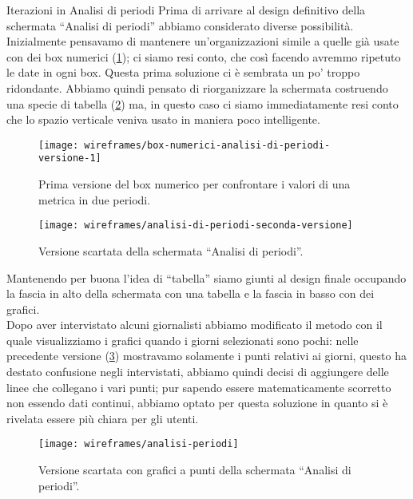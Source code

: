\documentclass[../../../main.tex]{subfiles}
\begin{document}
\begin{bclogo}{Iterazioni in Analisi di periodi}
Prima di arrivare al design definitivo della schermata ``Analisi di periodi'' abbiamo considerato diverse possibilità.\\
Inizialmente pensavamo di mantenere un'organizzazioni simile a quelle già usate con dei box numerici (\ref{fig:box-numerici-analisi-di-periodi-versione-1}); ci siamo resi conto, che così facendo avremmo ripetuto le date in ogni box. Questa prima soluzione ci è sembrata un po' troppo ridondante. Abbiamo quindi pensato di riorganizzare la schermata costruendo una specie di tabella (\ref{fig:analisi-di-periodi-seconda-versione}) ma, in questo caso ci siamo immediatamente resi conto che lo spazio verticale veniva usato in maniera poco intelligente.
\begin{figure}[H]
    \centering
    \texttt{[image: wireframes/box-numerici-analisi-di-periodi-versione-1]}
    \caption{Prima versione del box numerico per confrontare i valori di una metrica in due periodi.}\label{fig:box-numerici-analisi-di-periodi-versione-1}
\end{figure}
\begin{figure}[H]
    \centering
    \texttt{[image: wireframes/analisi-di-periodi-seconda-versione]}
    \caption{Versione scartata della schermata ``Analisi di periodi''.}
    \label{fig:analisi-di-periodi-seconda-versione}
\end{figure}

Mantenendo per buona l'idea di ``tabella'' siamo giunti al design finale occupando la fascia in alto della schermata con una tabella e la fascia in basso con dei grafici.\\
Dopo aver intervistato alcuni giornalisti abbiamo modificato il metodo con il quale visualizziamo i grafici quando i giorni selezionati sono pochi: nelle precedente versione (\ref{fig:old-analisi-periodo}) mostravamo solamente i punti relativi ai giorni, questo ha destato confusione negli intervistati, abbiamo quindi decisi di aggiungere delle linee che collegano i vari punti; pur sapendo essere matematicamente scorretto non essendo dati continui, abbiamo optato per questa soluzione in quanto si è rivelata essere più chiara per gli utenti.
\begin{figure}[H]
    \centering
    \texttt{[image: wireframes/analisi-periodi]}
    \caption{Versione scartata con grafici a punti della schermata ``Analisi di periodi''.}
    \label{fig:old-analisi-periodo}
\end{figure}
\end{bclogo}
\clearpage
\end{document}
